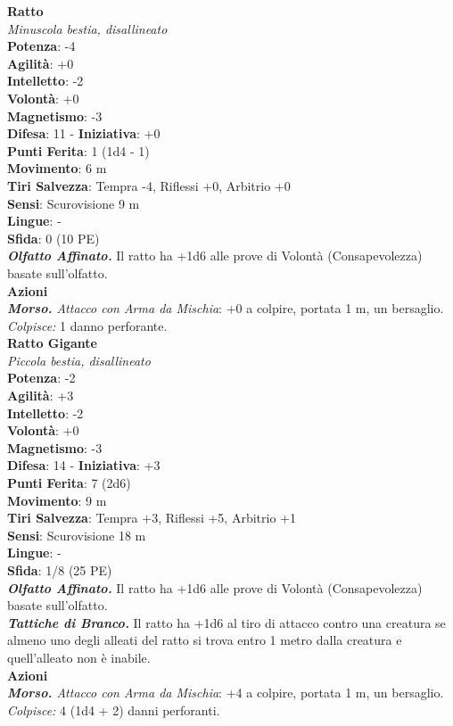 \begin{multicols}{2}
\medskip\textbf{Ratto}\\
\emph{Minuscola bestia, disallineato}\\
\textbf{Potenza}: -4\\
\textbf{Agilità}: +0\\
\textbf{Intelletto}: -2\\
\textbf{Volontà}: +0\\
\textbf{Magnetismo}: -3\\
\textbf{Difesa}: 11 - \textbf{Iniziativa}: +0\\
\textbf{Punti Ferita}: 1 (1d4 - 1)\\
\textbf{Movimento}: 6 m\\
\textbf{Tiri Salvezza}: Tempra -4, Riflessi +0, Arbitrio +0 \\
\textbf{Sensi}: Scurovisione 9 m\\
\textbf{Lingue}: -\\
\textbf{Sfida}: 0 (10 PE)\smallskip\\
\emph{\textbf{Olfatto Affinato.}} Il ratto ha +1d6 alle prove di Volontà (Consapevolezza) basate sull'olfatto.\\
\smallskip\textbf{Azioni}\\
\emph{\textbf{Morso.} Attacco con Arma da Mischia}: +0 a colpire, portata 1 m, un bersaglio.\\
\emph{Colpisce:} 1 danno perforante.\\

\medskip\textbf{Ratto Gigante}\\
\emph{Piccola bestia, disallineato}\\
\textbf{Potenza}: -2\\
\textbf{Agilità}: +3\\
\textbf{Intelletto}: -2\\
\textbf{Volontà}: +0\\
\textbf{Magnetismo}: -3\\
\textbf{Difesa}: 14 - \textbf{Iniziativa}: +3\\
\textbf{Punti Ferita}: 7 (2d6)\\
\textbf{Movimento}: 9 m\\
\textbf{Tiri Salvezza}: Tempra +3, Riflessi +5, Arbitrio +1 \\
\textbf{Sensi}: Scurovisione 18 m\\
\textbf{Lingue}: -\\
\textbf{Sfida}: 1/8 (25 PE)\smallskip\\
\emph{\textbf{Olfatto Affinato.}} Il ratto ha +1d6 alle prove di Volontà (Consapevolezza) basate sull'olfatto.\\
\emph{\textbf{Tattiche di Branco.}} Il ratto ha +1d6 al tiro di attacco contro una creatura se almeno uno degli alleati del ratto si trova entro 1 metro dalla creatura e quell'alleato non è inabile. \\
\smallskip\textbf{Azioni}\\
\emph{\textbf{Morso.} Attacco con Arma da Mischia}: +4 a colpire, portata 1 m, un bersaglio.\\
\emph{Colpisce:} 4 (1d4 + 2) danni perforanti.\\


\end{multicols}

